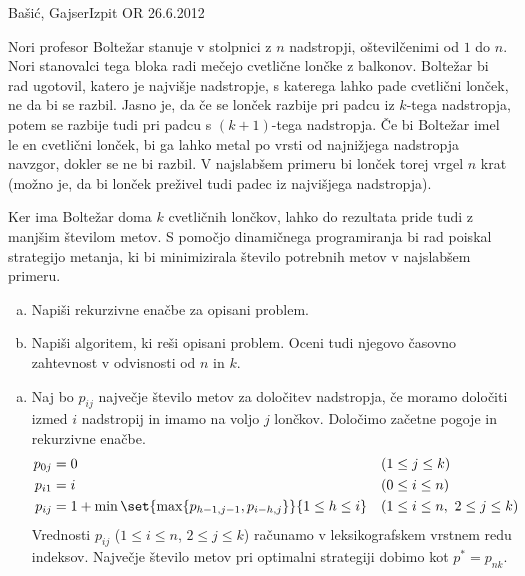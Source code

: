 \begin{naloga}{Bašić, Gajser}{Izpit OR 26.6.2012}
\begin{vprasanje}
Nori profesor Boltežar stanuje v stolpnici z $n$ nadstropji,
oštevilčenimi od $1$ do $n$.
Nori stanovalci tega bloka radi mečejo cvetlične lončke z balkonov.
Boltežar bi rad ugotovil, katero je najvišje nadstropje,
s katerega lahko pade cvetlični lonček, ne da bi se razbil.
Jasno je, da če se lonček razbije pri padcu iz $k$-tega nadstropja,
potem se razbije tudi pri padcu s $(k+1)$-tega nadstropja.
Če bi Boltežar imel le en cvetlični lonček,
bi ga lahko metal po vrsti od najnižjega nadstropja navzgor,
dokler se ne bi razbil.
V najslabšem primeru bi lonček torej vrgel $n$ krat
(možno je, da bi lonček preživel tudi padec iz najvišjega nadstropja).

Ker ima Boltežar doma $k$ cvetličnih lončkov,
lahko do rezultata pride tudi z manjšim številom metov.
S pomočjo dinamičnega programiranja bi rad po\-iskal strategijo metanja,
ki bi minimizirala število potrebnih metov v najslabšem primeru.
\begin{enumerate}[(a)]
\item Napiši rekurzivne enačbe za opisani problem.
\item Napiši algoritem, ki reši opisani problem.
Oceni tudi njegovo časovno zahtevnost v odvisnosti od $n$ in $k$.
\end{enumerate}
\end{vprasanje}

\begin{odgovor}
\begin{enumerate}[(a)]
\item Naj bo $p_{ij}$ največje število metov za določitev nadstropja,
če moramo določiti izmed $i$ nadstropij in imamo na voljo $j$ lončkov.
Določimo začetne pogoje in rekurzivne enačbe.
\begin{align*}
p_{0j} &= 0 && (1 \le j \le k) \\
p_{i1} &= i && (0 \le i \le n) \\
p_{ij} &= 1 + \min\set{\max\{p_{h-1,j-1}, p_{i-h,j}\}}{1 \le h \le i}
&& (1 \le i \le n, \ 2 \le j \le k)
\end{align*}
Vrednosti $p_{ij}$ ($1 \le i \le n$, $2 \le j \le k$)
računamo v leksikografskem vrstnem redu indeksov.
Največje število metov pri optimalni strategiji dobimo kot $p^* = p_{nk}$.


\end{enumerate}
\end{odgovor}
\end{naloga}
